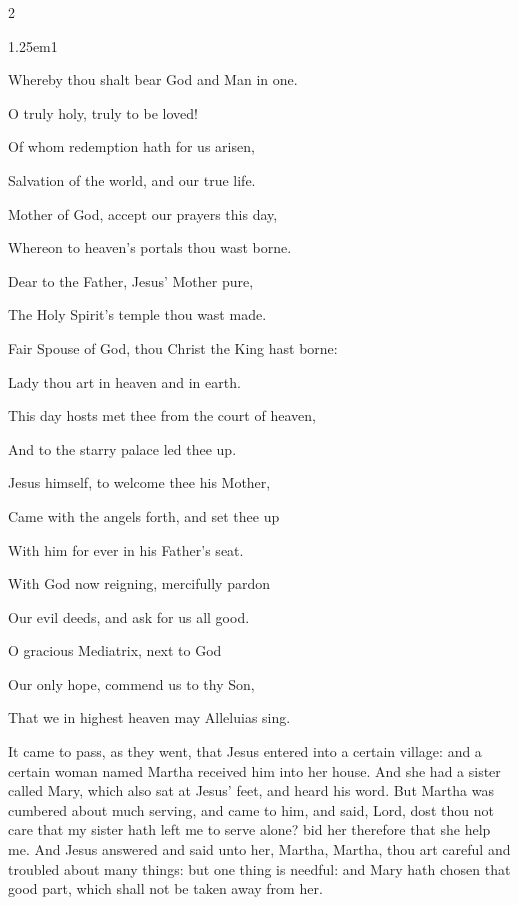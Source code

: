 \begin{multicols}{2}
\begin{hangparas}{1.25em}{1}
\vspace{0.5\baselineskip}

Whereby thou shalt bear God and Man in one.

O truly holy, truly to be loved!

Of whom redemption hath for us arisen,

Salvation of the world, and our true life.

\vspace{0.5\baselineskip}

Mother of God, accept our prayers this day,

Whereon to heaven's portals thou wast borne.

Dear to the Father, Jesus' Mother pure,

The Holy Spirit's temple thou wast made.

\vspace{0.5\baselineskip}

Fair Spouse of God, thou Christ the King hast borne:

Lady thou art in heaven and in earth.

This day hosts met thee from the court of heaven,

And to the starry palace led thee up.

\vspace{0.5\baselineskip}

Jesus himself, to welcome thee his Mother,

Came with the angels forth, and set thee up

With him for ever in his Father's seat.

With God now reigning, mercifully pardon

\vspace{0.5\baselineskip}

Our evil deeds, and ask for us all good.

O gracious Mediatrix, next to God

Our only hope, commend us to thy Son,

That we in highest heaven may Alleluias sing.
\end{hangparas}
\end{multicols}

 It came to pass, as they went, that Jesus entered into a certain village: and a certain woman named Martha received him into her house. And she had a sister called Mary, which also sat at Jesus' feet, and heard his word. But Martha was cumbered about much serving, and came to him, and said, Lord, dost thou not care that my sister hath left me to serve alone? bid her therefore that she help me. And Jesus answered and said unto her, Martha, Martha, thou art careful and troubled about many things: but one thing is needful: and Mary hath chosen that good part, which shall not be taken away from her.

